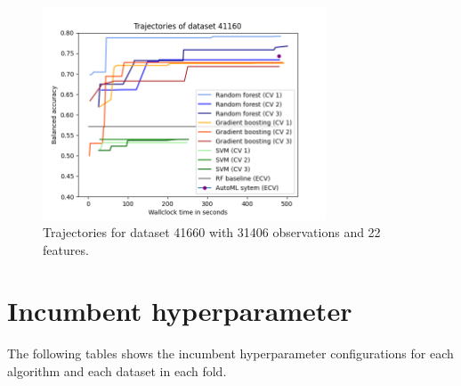 \documentclass[11pt]{article}
\begin{document}
\begin{figure}[H]
 \centering
  \includegraphics[width=0.75\textwidth]{fig/plot_dataset_41160.png}
  \caption{Trajectories for dataset 41660 with 31406 observations and 22 features.}
\end{figure}

\section{Incumbent hyperparameter}

The following tables shows the incumbent hyperparameter configurations for each algorithm and each dataset in each fold. 
\end{document}
